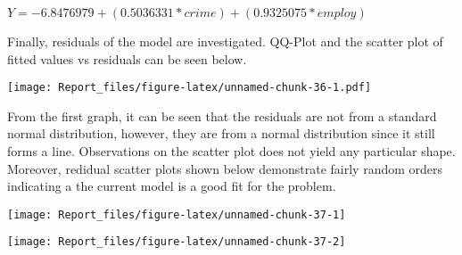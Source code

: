 \documentclass[]{article}
\begin{document}
\(Y = -6.8476979 + (0.5036331 * crime) + (0.9325075 * employ)\)

Finally, residuals of the model are investigated. QQ-Plot and the
scatter plot of fitted values vs residuals can be seen below.

\texttt{[image: Report\_files/figure-latex/unnamed-chunk-36-1.pdf]}

From the first graph, it can be seen that the residuals are not from a
standard normal distribution, however, they are from a normal
distribution since it still forms a line. Observations on the scatter
plot does not yield any particular shape. Moreover, redidual scatter
plots shown below demonstrate fairly random orders indicating a the
current model is a good fit for the problem.

\begin{center}\texttt{[image: Report\_files/figure-latex/unnamed-chunk-37-1]} \end{center}

\begin{center}\texttt{[image: Report\_files/figure-latex/unnamed-chunk-37-2]} \end{center}
\end{document}

